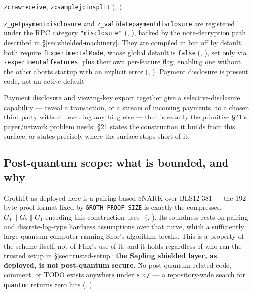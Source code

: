 \begin{description}
  \texttt{zcrawreceive}, \texttt{zcsamplejoinsplit} (\shipped,
  ).
\item[Payment disclosure] \texttt{z\_getpaymentdisclosure} and \texttt{z\_validatepaymentdisclosure}
  are registered under the RPC category \texttt{"disclosure"} (\shipped,
  ), backed by the note-decryption path described
  in \S\ref{sec:shielded-machinery}. They are compiled in but off by default: both require
  \texttt{f\allowbreak{}Experimental\allowbreak{}Mode}, whose global default is \texttt{false} (\inprogress,
  ), set only via \texttt{-\allowbreak{}experimentalfeatures}, plus their own
  per-feature flag; enabling one without the other aborts startup with an explicit error
  (\inprogress, ). Payment disclosure is present code, not
  an active default.
\end{description}

Payment disclosure and viewing-key export together give a selective-disclosure capability — reveal a
transaction, or a stream of incoming payments, to a chosen third party without revealing anything
else — that is exactly the primitive \S21's payer/network problem needs; \S21 states the construction
it builds from this surface, or states precisely where the surface stops short of it.

\subsection{Post-quantum scope: what is bounded, and why}
\label{sec:pq-scope}

Groth16 as deployed here is a pairing-based SNARK over BLS12-381 — the 192-byte proof format fixed by
\texttt{GROTH\_PROOF\_SIZE} is exactly the compressed $G_1\|G_2\|G_1$ encoding this construction
uses~\citep{groth2016size} (\shipped, ). Its soundness
rests on pairing- and discrete-log-type hardness assumptions over that curve, which a
sufficiently large quantum computer running Shor's algorithm breaks. This is a property of the
scheme itself, not of Flux's use of it, and it holds regardless of who ran the trusted setup in
\S\ref{sec:trusted-setup}: \textbf{the Sapling shielded layer, as deployed, is not post-quantum
secure.} No post-quantum-related code, comment, or TODO exists anywhere under \texttt{src/} —
a repository-wide search for \texttt{quantum} returns zero hits (\shipped, ).

